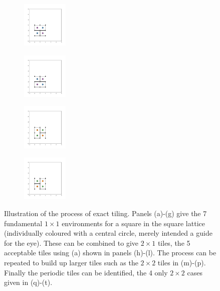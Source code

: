 \begin{figure}[bt]
     \begin{subfigure}[b]{0.19\textwidth}
         \centering
         \includegraphics[height=2.2cm]{./figures/procrystals/2x2_0p.pdf}
         \caption{}
         \label{fig:et2x2p_0}
     \end{subfigure}
     \hfill
      \begin{subfigure}[b]{0.19\textwidth}
         \centering
         \includegraphics[height=2.2cm]{./figures/procrystals/2x2_2p.pdf}
         \caption{}
         \label{fig:et2x2p_1}
     \end{subfigure}
     \hfill
      \begin{subfigure}[b]{0.19\textwidth}
         \centering
         \includegraphics[height=2.2cm]{./figures/procrystals/2x2_1p.pdf}
         \caption{}
         \label{fig:et2x2p_2}
     \end{subfigure}
     \hfill
      \begin{subfigure}[b]{0.19\textwidth}
         \centering
         \includegraphics[height=2.2cm]{./figures/procrystals/2x2_3p.pdf}
         \caption{}
         \label{fig:et2x2p_3}
     \end{subfigure}
     \hfill
    
     \caption{Illustration of the process of exact tiling. Panels (a)\--(g) give the 7 fundamental $1\times 1$ environments for a square in the square lattice (individually coloured with a central circle, merely intended a guide for the eye). These can be combined to give $2\times 1$ tiles, the 5 acceptable tiles using (a) shown in panels (h)\--(l). The process can be repeated to build up larger tiles such as the $2\times 2$ tiles in (m)\--(p). Finally the periodic tiles can be identified, the 4 only $2\times 2$ cases given in (q)\--(t).}
     \label{fig:exacttiling}
\end{figure}


